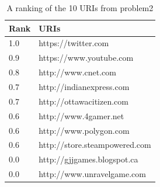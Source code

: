 \documentclass[12pt]{article}
\begin{document}
\begin{table}[h!]
\begin{center}
\begin{tabular}{ | m{0.5in} | m{3in} | } 
\hline
Rank & URIs\\
\hline
1.0 & https://twitter.com \\ 
\hline
0.9 & https://www.youtube.com \\ 
\hline
0.8 & http://www.cnet.com \\ 
\hline
0.7 & http://indianexpress.com \\ 
\hline
0.7 & http://ottawacitizen.com \\ 
\hline
0.6 & http://www.4gamer.net \\ 
\hline
0.6 & http://www.polygon.com \\ 
\hline
0.6 & http://store.steampowered.com \\ 
\hline
0.0 & http://gjjgames.blogspot.ca \\ 
\hline
0.0 & http://www.unravelgame.com \\ 
\hline
\end{tabular}
\end{center}
\caption{A ranking of the 10 URIs from problem2}
\label{Table 2:}
\end{table}
\end{document}
